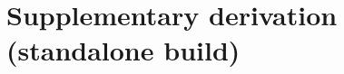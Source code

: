 \documentclass[11pt]{article}
\begin{document}
\section*{Supplementary derivation (standalone build)}

\end{document}
